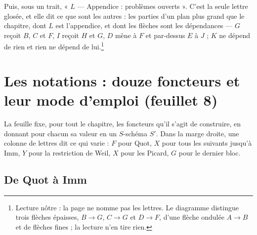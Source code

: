 \documentclass[11pt,a4paper]{article}
\begin{document}
Puis, sous un trait, « $L$ — Appendice : problèmes ouverts ». C'est la seule
lettre glosée, et elle dit ce que sont les autres : les parties d'un plan
plus grand que le chapitre, dont $L$ est l'appendice, et dont les flèches
sont les dépendances — $G$ reçoit $B$, $C$ et $F$, $I$ reçoit $H$ et $G$, $D$
mène à $F$ et par-dessus $E$ à $J$ ; $K$ ne dépend de rien et rien ne dépend
de lui.\footnote{Lecture nôtre : la page ne nomme pas les lettres. Le
diagramme distingue trois flèches épaisses, $B \to G$, $C \to G$ et $D \to F$,
d'une flèche ondulée $A \to B$ et de flèches fines ; la lecture n'en tire
rien.}

\section*{Les notations : douze foncteurs et leur mode d'emploi (feuillet 8)}

La feuille fixe, pour tout le chapitre, les foncteurs qu'il s'agit de
construire, en donnant pour chacun sa valeur en un $S$-schéma $S'$. Dans la
marge droite, une colonne de lettres dit ce qui varie : $F$ pour Quot, $X$
pour tous les suivants jusqu'à Imm, $Y$ pour la restriction de Weil, $X$ pour
les Picard, $G$ pour le dernier bloc.

\subsection*{De Quot à Imm}
\end{document}
